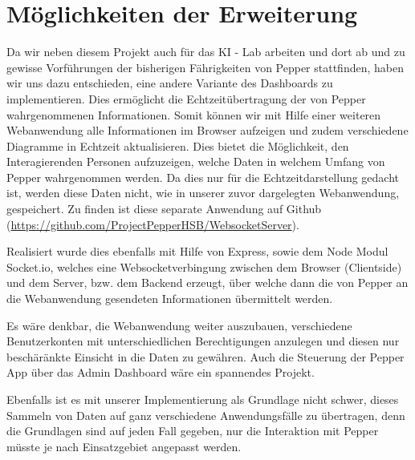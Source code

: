 \section{Möglichkeiten der Erweiterung}
Da wir neben diesem Projekt auch für das KI - Lab arbeiten und dort ab und zu gewisse Vorführungen der bisherigen Fährigkeiten von Pepper stattfinden, haben wir uns dazu entschieden, eine andere Variante des Dashboards zu implementieren. Dies ermöglicht die
Echtzeitübertragung der von Pepper wahrgenommenen Informationen. Somit können wir mit Hilfe einer weiteren Webanwendung alle Informationen im Browser aufzeigen und zudem verschiedene Diagramme in Echtzeit aktualisieren. Dies bietet die Möglichkeit, den Interagierenden Personen aufzuzeigen, welche Daten in welchem Umfang von Pepper wahrgenommen werden. Da dies nur für die Echtzeitdarstellung gedacht ist, werden diese Daten nicht, wie in unserer zuvor dargelegten Webanwendung, gespeichert. Zu finden ist diese separate Anwendung auf Github (\href{https://github.com/ProjectPepperHSB/WebsocketServer}{https://github.com/ProjectPepperHSB/WebsocketServer}).

Realisiert wurde dies ebenfalls mit Hilfe von Express, sowie dem Node Modul Socket.io, welches eine Websocketverbingung zwischen dem Browser (Clientside) und dem Server, bzw. dem Backend erzeugt, über welche dann die von Pepper an die Webanwendung gesendeten Informationen übermittelt werden.

Es wäre denkbar, die Webanwendung weiter auszubauen, verschiedene Benutzerkonten mit unterschiedlichen Berechtigungen anzulegen und diesen nur beschäränkte Einsicht in die Daten zu gewähren. Auch die Steuerung der Pepper App über das Admin Dashboard wäre ein spannendes Projekt.

Ebenfalls ist es mit unserer Implementierung als Grundlage nicht schwer, dieses Sammeln von Daten auf ganz verschiedene Anwendungsfälle zu übertragen, denn die Grundlagen sind auf jeden Fall gegeben, nur die Interaktion mit Pepper müsste je nach Einsatzgebiet angepasst werden.